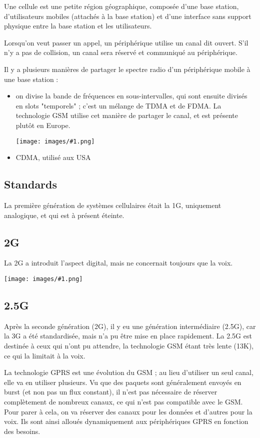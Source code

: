 \documentclass[10pt,a4paper]{report}
\newcommand{\dessin}[1]{\begin{center}\texttt{[image: images/\#1.png]}\end{center}}
\begin{document}
	Une cellule est une petite région géographique, composée d'une base station, d'utilisateurs mobiles (attachés à la base station) et d'une interface sans support physique entre la base station et les utilisateurs.
	
  Lorsqu'on veut passer un appel, un périphérique utilise un canal dit ouvert. S'il n'y a pas de collision, un canal sera réservé et communiqué au périphérique.
  
  Il y a plusieurs manières de partager le spectre radio d'un périphérique mobile à une base station :
  
  \begin{itemize}
    \item on divise la bande de fréquences en sous-intervalles, qui sont ensuite divisés en slots "temporels" ; c'est un mélange de TDMA et de FDMA. La technologie GSM utilise cet manière de partager le canal, et est présente plutôt en Europe.
    
    \dessin{46}
    
    \item CDMA, utilisé aux USA
  \end{itemize}
  
  \subsection{Standards}
  
  La première génération de systèmes cellulaires était la 1G, uniquement analogique, et qui est à présent éteinte. 
  
  	\subsection{2G}
  	
  	La 2G a introduit l'aspect digital, mais ne concernait toujours que la voix.
	
	\dessin{47}
	
	\subsection{2.5G}
  	
	Après la seconde génération (2G), il y eu une génération intermédiaire (2.5G), car la 3G a été standardisée, mais n'a pu être mise en place rapidement. La 2.5G est destinée à ceux qui n'ont pu attendre, la technologie GSM étant très lente (13K), ce qui la limitait à la voix.
	
	La technologie GPRS est une évolution du GSM ; au lieu d'utiliser un seul canal, elle va en utiliser plusieurs. Vu que des paquets sont généralement envoyés en burst (et non pas un flux constant), il n'est pas nécessaire de réserver complètement de nombreux canaux, ce qui n'est pas compatible avec le GSM. Pour parer à cela, on va réserver des canaux pour les données et d'autres pour la voix. Ils sont ainsi alloués dynamiquement aux périphériques GPRS en fonction des besoins.
  
\end{document}
